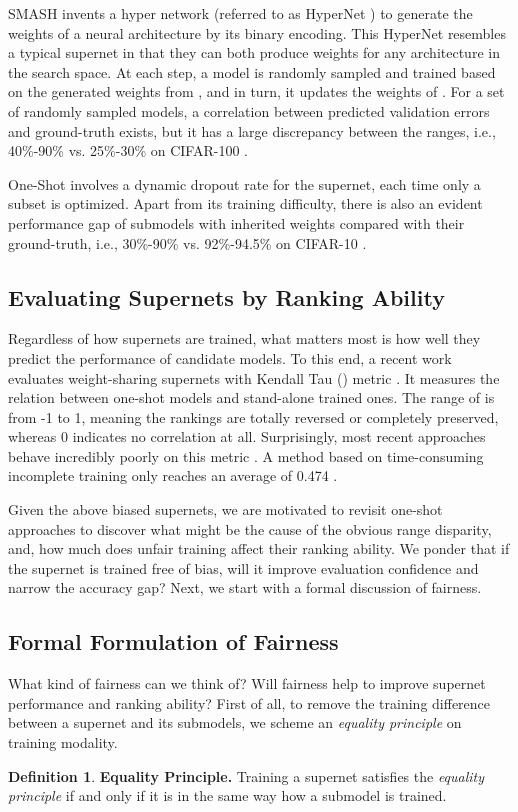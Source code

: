 \documentclass[10pt,twocolumn,letterpaper]{article}
\theoremstyle{definition}
\newtheorem{definition}{Definition}[section]
\begin{document}
SMASH \cite{brock2017smash} invents a hyper network (referred to as HyperNet ) to generate the weights of a neural architecture by its binary encoding. This HyperNet resembles a typical supernet in that they can both produce weights for any architecture in the search space. At each step, a model is randomly sampled and trained based on the generated weights from , and in turn, it updates the weights of . For a set of randomly sampled models, a correlation between predicted validation errors and ground-truth exists, but it has a large discrepancy between the ranges, i.e., 40\%-90\% vs. 25\%-30\% on CIFAR-100 \cite{krizhevsky2009learning}.

One-Shot \cite{bender2018understanding} involves a dynamic dropout rate for the supernet, each time only a subset is optimized. Apart from its training difficulty, there is also an evident performance gap of submodels with inherited weights compared with their ground-truth, i.e., 30\%-90\% vs. 92\%-94.5\% on CIFAR-10 \cite{krizhevsky2009learning}. 


\subsection{Evaluating Supernets by Ranking Ability}
Regardless of how supernets are trained, what matters most is how well they predict the performance of candidate models. To this end, a recent work \cite{sciuto2019evaluating} evaluates weight-sharing supernets with Kendall Tau () metric \cite{kendall1938new}. It measures the relation between one-shot models and stand-alone trained ones. The range of  is from -1 to 1, meaning the rankings are totally reversed or completely preserved, whereas 0 indicates no correlation at all. Surprisingly, most recent approaches behave incredibly poorly on this metric \cite{luo2018neural,pham2018efficient,sciuto2019evaluating}. A method based on time-consuming incomplete training only reaches an average  of 0.474 \cite{zheng2019multi}.

Given the above biased supernets, we are motivated to revisit one-shot approaches to discover what might be the cause of the obvious range disparity, and, how much does unfair training affect their ranking ability. We ponder that if the supernet is trained free of bias, will it improve evaluation confidence and narrow the accuracy gap? Next, we start with a formal discussion of fairness.

\subsection{Formal Formulation of Fairness}
What kind of fairness can we think of? Will fairness help to improve supernet performance and ranking ability? First of all, to remove the training difference between a supernet and its submodels, we scheme an \emph{equality principle} on training modality.
\begin{definition}\label{def:equal}
\textbf{Equality Principle.} Training a supernet satisfies the \emph{equality principle} if and only if it is in the same way how a submodel is trained.
\end{definition}
\end{document}
